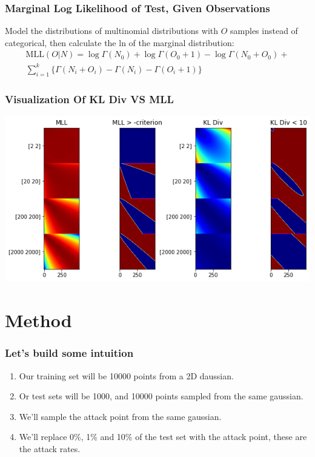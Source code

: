 \documentclass{beamer}
\begin{document}
\begin{frame}
    \frametitle{Marginal Log Likelihood of Test, Given Observations}
    Model the distributions of multinomial distributions with $O$ samples instead of categorical, then calculate the ln of the marginal distribution:
    \begin{multline}
        \text{MLL}(O|N) = \log \Gamma(N_0) + \log \Gamma(O_0 + 1) - \log \Gamma(N_0 + O_0) + \\ \sum_{i=1}^k \lbrace \Gamma(N_i + O_i) - \Gamma(N_i) - \Gamma(O_i + 1) \rbrace
    \end{multline}
\end{frame}

\begin{frame}
    \frametitle{Visualization Of KL Div VS MLL}
    \begin{center}
        \includegraphics[scale=0.5]{goodness_of_fit.png}
    \end{center}
\end{frame}

\section{Method}
\begin{frame}
    \frametitle{Let's build some intuition}
    \begin{enumerate}
        \item Our training set will be 10000 points from a 2D daussian.
        \item Or test sets will be 1000, and 10000 points sampled from the same gaussian.
        \item We'll sample the attack point from the same gaussian.
        \item We'll replace 0\%, 1\% and 10\% of the test set with the attack point, these are the attack rates. 
    \end{enumerate} 
\end{frame}
\end{document}
